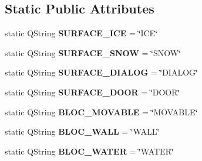 \subsection*{Static Public Attributes}
\begin{DoxyCompactItemize}
\item 
\hypertarget{class_factory___surface_abd5bacb06b3aa404e8011e8d25626b13}{}static Q\+String {\bfseries S\+U\+R\+F\+A\+C\+E\+\_\+\+I\+C\+E} = \char`\"{}I\+C\+E\char`\"{}\label{class_factory___surface_abd5bacb06b3aa404e8011e8d25626b13}

\item 
\hypertarget{class_factory___surface_a8bbb2eeb0182af5fd302675bdfd06b3d}{}static Q\+String {\bfseries S\+U\+R\+F\+A\+C\+E\+\_\+\+S\+N\+O\+W} = \char`\"{}S\+N\+O\+W\char`\"{}\label{class_factory___surface_a8bbb2eeb0182af5fd302675bdfd06b3d}

\item 
\hypertarget{class_factory___surface_ad8893c40baacc04c83405ab47f110d2d}{}static Q\+String {\bfseries S\+U\+R\+F\+A\+C\+E\+\_\+\+D\+I\+A\+L\+O\+G} = \char`\"{}D\+I\+A\+L\+O\+G\char`\"{}\label{class_factory___surface_ad8893c40baacc04c83405ab47f110d2d}

\item 
\hypertarget{class_factory___surface_ad77044d144962f5348bac7d873687ae1}{}static Q\+String {\bfseries S\+U\+R\+F\+A\+C\+E\+\_\+\+D\+O\+O\+R} = \char`\"{}D\+O\+O\+R\char`\"{}\label{class_factory___surface_ad77044d144962f5348bac7d873687ae1}

\item 
\hypertarget{class_factory___surface_a00f8f75341d84c013f807508cfeb3283}{}static Q\+String {\bfseries B\+L\+O\+C\+\_\+\+M\+O\+V\+A\+B\+L\+E} = \char`\"{}M\+O\+V\+A\+B\+L\+E\char`\"{}\label{class_factory___surface_a00f8f75341d84c013f807508cfeb3283}

\item 
\hypertarget{class_factory___surface_a4c7a4f2f0b1740b52b6023b5730aacff}{}static Q\+String {\bfseries B\+L\+O\+C\+\_\+\+W\+A\+L\+L} = \char`\"{}W\+A\+L\+L\char`\"{}\label{class_factory___surface_a4c7a4f2f0b1740b52b6023b5730aacff}

\item 
\hypertarget{class_factory___surface_ad30fd833d02d4c18834829d1cd8b5317}{}static Q\+String {\bfseries B\+L\+O\+C\+\_\+\+W\+A\+T\+E\+R} = \char`\"{}W\+A\+T\+E\+R\char`\"{}\label{class_factory___surface_ad30fd833d02d4c18834829d1cd8b5317}

\end{DoxyCompactItemize}


